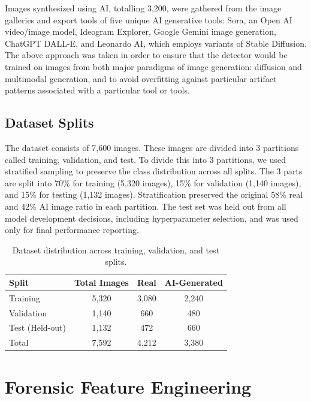 Images synthesized using AI, totalling 3,200, were gathered from the image galleries and export tools of five unique AI generative tools: Sora, an Open AI video/image model, Ideogram Explorer, Google Gemini image generation, ChatGPT DALL-E, and Leonardo AI, which employs variants of Stable Diffusion. The above approach was taken in order to ensure that the detector would be trained on images from both major paradigms of image generation: diffusion and multimodal generation, and to avoid overfitting against particular artifact patterns associated with a particular tool or tools.

\subsection{Dataset Splits}

The dataset consists of 7,600 images. These images are divided into 3 partitions called training, validation, and test. To divide this into 3 partitions, we used stratified sampling to preserve the class distribution across all splits. The 3 parts are split into 70\% for training (5,320 images), 15\% for validation (1,140 images), and 15\% for testing (1,132 images). Stratification preserved the original 58\% real and 42\% AI image ratio in each partition. The test set was held out from all model development decisions, including hyperparameter selection, and was used only for final performance reporting.

\begin{table}[htbp]
    \centering
    \caption{Dataset distribution across training, validation, and test splits.}
    \label{tab:dataset}
    \begin{tabular}{lccc}
        \toprule
        \textbf{Split} & \textbf{Total Images} & \textbf{Real} & \textbf{AI-Generated} \\
        \midrule
        Training        & 5,320 & 3,080 & 2,240 \\
        Validation      & 1,140 & 660   & 480   \\
        Test (Held-out) & 1,132 & 472   & 660   \\
        \midrule
        Total           & 7,592 & 4,212 & 3,380 \\
        \bottomrule
    \end{tabular}
\end{table}

\section{Forensic Feature Engineering}

